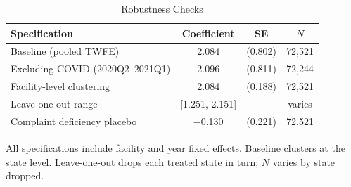 \begin{table}[htbp]
\centering
\caption{Robustness Checks}
\label{tab:robustness}
\begin{tabular}{lccc}
\toprule
Specification & Coefficient & SE & $N$ \\
\midrule
Baseline (pooled TWFE) & 2.084 & (0.802) & 72,521 \\
Excluding COVID (2020Q2--2021Q1) & 2.096 & (0.811) & 72,244 \\
Facility-level clustering & 2.084 & (0.188) & 72,521 \\
Leave-one-out range & [1.251, 2.151] & & varies \\
Complaint deficiency placebo & $-$0.130 & (0.221) & 72,521 \\
\bottomrule
\end{tabular}
\begin{flushleft}\small
All specifications include facility and year fixed effects. Baseline clusters at the state level. Leave-one-out drops each treated state in turn; $N$ varies by state dropped.
\end{flushleft}
\end{table}
